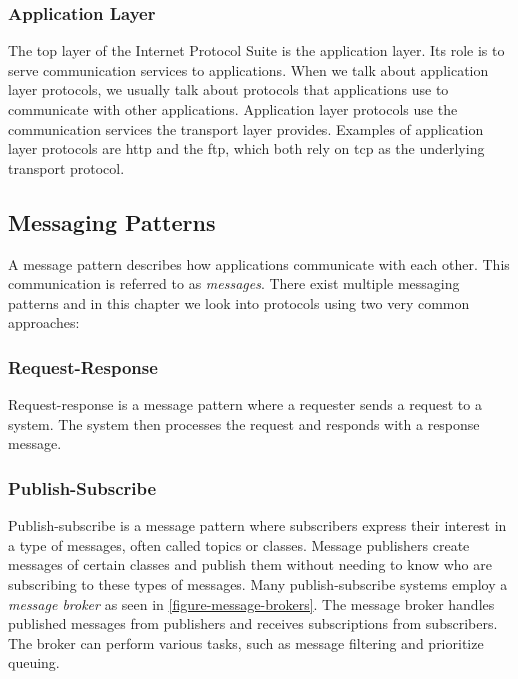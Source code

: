 \subsubsection{Application Layer}

The top layer of the Internet Protocol Suite is the application layer. Its role
is to serve communication services to applications. When we talk about
application layer protocols, we usually talk about protocols that applications
use to communicate with other applications. Application layer protocols use the
communication services the transport layer provides. Examples of application
layer protocols are \gls{http} and the \gls{ftp}, which both rely on \gls{tcp}
as the underlying transport protocol.

\subsection{Messaging Patterns}

A message pattern describes how applications communicate with each other. This
communication is referred to as \textit{messages}. There exist multiple
messaging patterns and in this chapter we look into protocols using two very
common approaches:

\subsubsection{Request-Response}

Request-response is a message pattern where a requester sends a request to a
system. The system then processes the request and responds with a response
message.

\subsubsection{Publish-Subscribe}

Publish-subscribe is a message pattern where subscribers express their interest
in a type of messages, often called topics or classes. Message publishers create
messages of certain classes and publish them without needing to know who are
subscribing to these types of messages.  Many publish-subscribe systems employ a
\textit{message broker} as seen in \cref{figure-message-brokers}. The message
broker handles published messages from publishers and receives subscriptions
from subscribers. The broker can perform various tasks, such as message
filtering and prioritize queuing.


